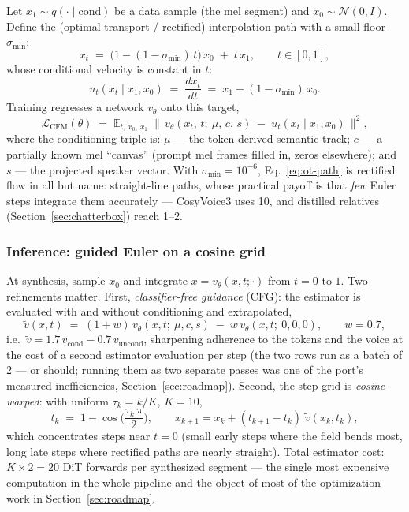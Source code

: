 \documentclass[11pt,a4paper]{article}
\newcommand{\vth}{\ensuremath{v_\theta}}
\newcommand{\E}{\mathbb{E}}
\begin{document}
Let $x_1 \sim q(\cdot \mid \mathrm{cond})$ be a data sample (the mel segment) and
$x_0 \sim \mathcal{N}(0, I)$. Define the (optimal-transport / rectified) interpolation
path with a small floor $\sigma_{\min}$:
\begin{equation}
x_t \;=\; \big(1 - (1-\sigma_{\min})\,t\big)\, x_0 \;+\; t\, x_1,
\qquad t \in [0,1],
\label{eq:ot-path}
\end{equation}
whose conditional velocity is constant in $t$:
\begin{equation}
u_t(x_t \mid x_1, x_0) \;=\; \frac{d x_t}{dt} \;=\; x_1 - (1-\sigma_{\min})\, x_0 .
\label{eq:cfm-target}
\end{equation}
Training regresses a network $\vth$ onto this target,
\begin{equation}
\mathcal{L}_{\mathrm{CFM}}(\theta) \;=\;
\E_{t,\,x_0,\,x_1}\;
\big\lVert\, \vth(x_t,\, t;\ \mu,\, c,\, s) \;-\; u_t(x_t \mid x_1, x_0) \,\big\rVert^2 ,
\label{eq:cfm-loss}
\end{equation}
where the conditioning triple is: $\mu$ --- the token-derived semantic track;
$c$ --- a partially known mel ``canvas'' (prompt mel frames filled in, zeros
elsewhere); and $s$ --- the projected speaker vector. With $\sigma_{\min} = 10^{-6}$,
Eq.~\eqref{eq:ot-path} is rectified flow in all but name: straight-line paths, whose
practical payoff is that \emph{few} Euler steps integrate them accurately --- CosyVoice3
uses 10, and distilled relatives (Section~\ref{sec:chatterbox}) reach 1--2.

\subsubsection{Inference: guided Euler on a cosine grid}

At synthesis, sample $x_0$ and integrate $\dot x = \vth(x,t;\cdot)$ from $t=0$ to $1$.
Two refinements matter. First, \emph{classifier-free guidance} (CFG): the estimator is
evaluated with and without conditioning and extrapolated,
\begin{equation}
\tilde v(x, t) \;=\; (1 + w)\, \vth(x, t;\ \mu, c, s)\;-\; w\, \vth(x, t;\ 0, 0, 0),
\qquad w = 0.7,
\label{eq:cfg}
\end{equation}
i.e.\ $\tilde v = 1.7\,v_{\mathrm{cond}} - 0.7\,v_{\mathrm{uncond}}$, sharpening
adherence to the tokens and the voice at the cost of a second estimator evaluation per
step (the two rows run as a batch of 2 --- or should; running them as two separate
passes was one of the port's measured inefficiencies,
Section~\ref{sec:roadmap}). Second, the step grid is \emph{cosine-warped}: with uniform
$\tau_k = k/K$, $K = 10$,
\begin{equation}
t_k \;=\; 1 - \cos\!\Big(\frac{\tau_k\, \pi}{2}\Big), \qquad
x_{k+1} = x_k + (t_{k+1} - t_k)\;\tilde v(x_k, t_k),
\label{eq:euler-cosine}
\end{equation}
which concentrates steps near $t = 0$ (small early steps where the field bends most,
long late steps where rectified paths are nearly straight). Total estimator cost:
$K \times 2 = 20$ DiT forwards per synthesized segment --- the single most expensive
computation in the whole pipeline and the object of most of the optimization work in
Section~\ref{sec:roadmap}.
\end{document}
